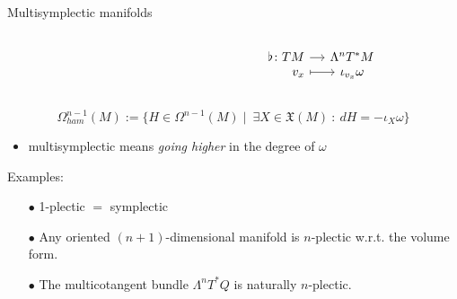 \documentclass[handout,10pt]{beamer}
\begin{document}
\begin{frame}[fragile]{Multisymplectic manifolds} %
	\begin{defblock}
		
	\end{defblock}
	\begin{defblock}
		\begin{columns}
			\hfill
			\begin{column}{.5\linewidth}
			\end{column}
			\begin{column}{.5\linewidth}
				\[
				\begin{tikzcd}[column sep= small,row sep=0ex,
				/tikz/column 1/.append style={anchor=base east}]
				    \flat \colon T M \ar[r]& \Lambda^n T^\ast M \\
  						 v_x \ar[r, mapsto]& \iota_{v_x} \omega						
				\end{tikzcd}	
				\]
			\end{column}
		\end{columns}
	\end{defblock}
	\pause
	\begin{defblock}
		\begin{displaymath}
			\Omega^{n-1}_{ham}(M) 	:=
			\biggr\{ H \in  \Omega^{n-1}(M) \; \biggr\vert \;~ 
				\exists X \in \mathfrak{X}(M) ~:~ d H = -\iota_X \omega \biggr\} 
			\end{displaymath}
	\end{defblock}
	\pause					
	\begin{itemize}
		\item multisymplectic means \emph{going higher} in the degree of $\omega$\pause
	\end{itemize}
	\vfill
	\begin{block}{Examples:}
		\begin{itemize}
			\item[$\bullet$] 1-plectic $=$ symplectic
			\item[$\bullet$] Any oriented $(n+1)$-dimensional manifold is $n$-plectic w.r.t. the volume form.
			\item[$\bullet$] The multicotangent bundle $\Lambda^n T^\ast Q$ is naturally $n$-plectic.
		\end{itemize}
	\end{block}			 
%
\end{frame}
\end{document}
